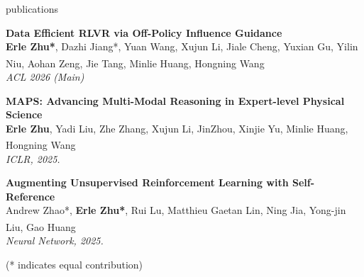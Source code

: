 \documentclass{resume} %
\begin{document}
\begin{rSection}{publications}


\begin{enumerate}[label={[\arabic*]}]
    \item \textbf{Data Efficient RLVR via Off-Policy Influence Guidance} \\
        \textbf{Erle Zhu*}, Dazhi Jiang*, Yuan Wang, Xujun Li, Jiale Cheng, Yuxian Gu, Yilin Niu, Aohan Zeng, Jie Tang, Minlie Huang, Hongning Wang\textsuperscript{\Letter} \\
        \textit{ACL 2026 (Main)} 
    \item \textbf{MAPS: Advancing Multi-Modal Reasoning in Expert-level Physical Science} \\
        \textbf{Erle Zhu}, Yadi Liu, Zhe Zhang, Xujun Li, JinZhou, Xinjie Yu, Minlie Huang, Hongning Wang\textsuperscript{\Letter} \\
        \textit{ICLR, 2025.}
    \item \textbf{Augmenting Unsupervised Reinforcement Learning with Self-Reference} \\
        Andrew Zhao*, \textbf{Erle Zhu*}, Rui Lu, Matthieu Gaetan Lin, Ning Jia, Yong-jin Liu, Gao Huang\textsuperscript{\Letter} \\
        \textit{Neural Network, 2025.}

       
\end{enumerate}
    (* indicates equal contribution)
\end{rSection} 

\end{document}
